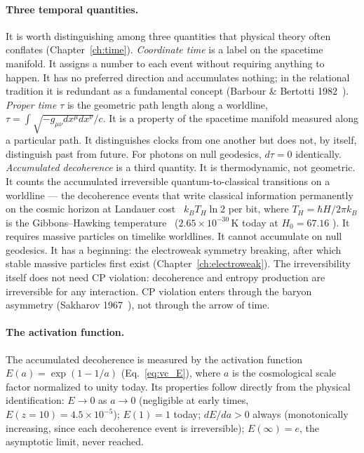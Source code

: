 \paragraph{Three temporal quantities.} It is worth distinguishing among three quantities that physical theory often conflates (Chapter~\ref{ch:time}).
\emph{Coordinate time} is a label on the spacetime manifold. It assigns a number to each event without requiring anything to happen. It has no preferred
direction and accumulates nothing; in the relational tradition it is redundant as a fundamental concept (Barbour \& Bertotti 1982~\cite{BarbourBertotti1982}).
\emph{Proper time} $\tau$ is the geometric path length along a worldline, $\tau=\int\sqrt{-g_{\mu\nu}dx^\mu dx^\nu}/c$. It is a property of the spacetime
manifold measured along a particular path. It distinguishes clocks from one another but does not, by itself, distinguish past from future. For photons on
null geodesics, $d\tau=0$ identically. \emph{Accumulated decoherence} is a third quantity. It is thermodynamic, not geometric. It counts the accumulated
irreversible quantum-to-classical transitions on a worldline --- the decoherence events that write classical information permanently on the cosmic horizon at
Landauer cost~\cite{Landauer1961} $k_BT_H\ln2$ per bit, where $T_H=\hbar H/2\pi k_B$ is the Gibbons--Hawking temperature~\cite{GibbonsHawking1977} ($2.65\times10^{-30}$\,K
today at $H_0=67.16$ \calc). It requires massive particles on timelike worldlines. It cannot accumulate on null geodesics. It has a beginning: the electroweak symmetry
breaking, after which stable massive particles first exist (Chapter~\ref{ch:electroweak}). The irreversibility itself does not need CP violation:
decoherence and entropy production are irreversible for any interaction. CP violation enters through the baryon asymmetry (Sakharov
1967~\cite{Sakharov1967}), not through the arrow of time. \interp

\paragraph{The activation function.} The accumulated decoherence is measured by the activation function $E(a)=\exp(1-1/a)$ (Eq.~\eqref{eq:vc_E}), where $a$ is
the cosmological scale factor normalized to unity today. Its properties follow directly from the physical identification: $E\to0$ as $a\to0$ (negligible at
early times, $E(z{=}10)=4.5\times10^{-5}$); $E(1)=1$ today; $dE/da>0$ always (monotonically increasing, since each decoherence event is irreversible);
$E(\infty)=e$, the asymptotic limit, never reached. \calc

